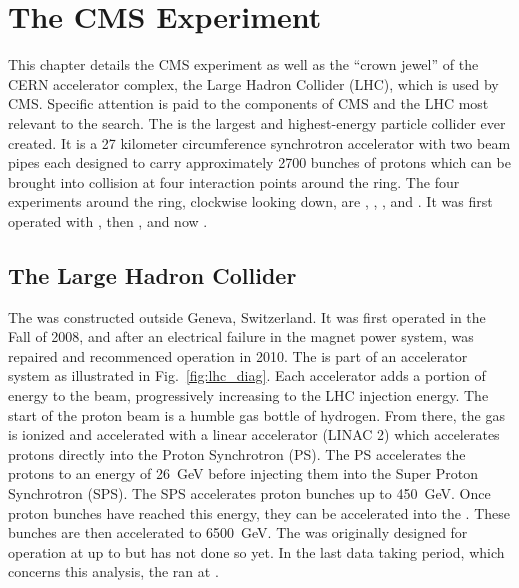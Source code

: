 \chapter{The CMS Experiment}
\label{ch:experiment_chapter}
This chapter details the CMS experiment as well as the ``crown jewel'' of the CERN accelerator complex, the Large Hadron Collider (LHC), which is used by CMS. Specific attention is paid to the components of CMS and the LHC most relevant to the \WR search.
The \LHC is the largest and highest-energy particle collider ever created.  It is a 27 kilometer circumference synchrotron accelerator with two beam pipes each designed to carry approximately 2700 bunches of protons which can be brought into collision at four interaction points around the ring. The four experiments around the ring, clockwise looking down, are \ALICE, \CMS, \LHCb, and \ATLAS.  It was first operated with \rootsseven, then \rootseight, and now \rootsthirteen.


\section{The Large Hadron Collider}
The \LHC was constructed outside Geneva, Switzerland.  It was first operated in the Fall of 2008, and after an electrical failure in the magnet power system, was repaired and recommenced operation in 2010. The \LHC is part of an accelerator system as illustrated in Fig.~\ref{fig:lhc_diag}.  Each accelerator adds a portion of energy to the beam, progressively increasing to the LHC injection energy.  The start of the \LHC proton beam is a humble gas bottle of hydrogen.  From there, the gas is ionized and accelerated with a linear accelerator (LINAC 2) which accelerates protons directly into the Proton Synchrotron (PS).  The PS accelerates the protons to an energy of \SI{26}{\GeV} before injecting them into the Super Proton Synchrotron (SPS).  The SPS accelerates proton bunches up to \SI{450}{\GeV}.  Once proton bunches have reached this energy, they can be accelerated into the \LHC. These bunches are then accelerated to \SI{6500}{\GeV}.  The \LHC was originally designed for operation at up to \rootsfourteen but has not done so yet. In the last data taking period, which concerns this analysis, the \LHC ran at \rootsthirteen.

